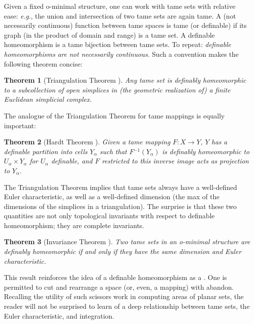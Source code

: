 \documentclass{psapm-l}
\newtheorem{theorem}{Theorem}[section]
\theoremstyle{definition}
\theoremstyle{remark}
\numberwithin{equation}{section}
\begin{document}
Given a fixed o-minimal structure, one can work with tame sets with relative ease: {{\em e.g.}}, the union and intersection of two tame sets are again tame. A (not necessarily continuous) function between tame spaces is tame (or definable) if its graph (in the product of domain and range) is a tame set. A definable homeomorphism is a tame bijection between tame sets. To repeat: {\em definable homeomorphisms are not necessarily continuous.} Such a convention makes the following theorem concise:

\begin{theorem}[Triangulation Theorem \cite{vdD}]
\label{thm:Triangulation}
Any tame set is definably homeomorphic to a subcollection of open simplices in (the geometric realization of) a finite Euclidean simplicial complex.
\end{theorem}

The analogue of the Triangulation Theorem for tame mappings is equally important:

\begin{theorem}[Hardt Theorem \cite{vdD}]
\label{thm:Hardt}
Given a tame mapping $F\colon X\to Y$, $Y$ has a definable partition into cells $Y_\alpha$ such that $F{^{-1}}(Y_\alpha)$ is definably homeomorphic to $U_\alpha\times Y_\alpha$ for $U_\alpha$ definable, and $F$ restricted to this inverse image acts as projection to $Y_\alpha$.
\end{theorem}

The Triangulation Theorem implies that tame sets always have a well-defined Euler characteristic, as well as a well-defined dimension (the max of the dimensions of the simplices in a triangulation). The surprise is that these two quantities are not only topological invariants with respect to definable homeomorphism; they are complete invariants.

\begin{theorem}[Invariance Theorem \cite{vdD}]
\label{thm:EulerDim}
Two tame sets in an o-minimal structure are definably homeomorphic if and only if they have the same dimension and Euler characteristic.
\end{theorem}

This result reinforces the idea of a definable homeomorphism as a {{}}. One is permitted to cut and rearrange a space (or, even, a mapping) with abandon. Recalling the utility of such scissors work in computing areas of planar sets, the reader will not be surprised to learn of a deep relationship between tame sets, the Euler characteristic, and integration.
\end{document}
